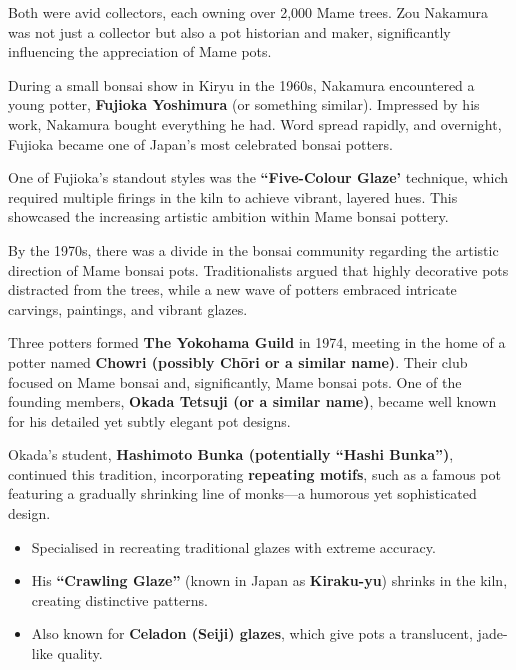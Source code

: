 Both were avid collectors, each owning over 2,000 Mame trees.
Zou Nakamura was not just a collector but also a pot historian and maker, significantly influencing the appreciation of Mame pots.

During a small bonsai show in Kiryu in the 1960s, Nakamura encountered a young potter, \textbf{Fujioka Yoshimura} (or something similar).
Impressed by his work, Nakamura bought everything he had.
Word spread rapidly, and overnight, Fujioka became one of Japan's most celebrated bonsai potters.

\medskip

\noindent
One of Fujioka's standout styles was the \textbf{``Five\--Colour Glaze'} technique, which required multiple firings in the kiln to achieve vibrant, layered hues.
This showcased the increasing artistic ambition within Mame bonsai pottery.

\medskip

\noindent
By the 1970s, there was a divide in the bonsai community regarding the artistic direction of Mame bonsai pots.
Traditionalists argued that highly decorative pots distracted from the trees, while a new wave of potters embraced intricate carvings, paintings, and vibrant glazes.

Three potters formed \textbf{The Yokohama Guild} in 1974, meeting in the home of a potter named \textbf{Chowri (possibly Chōri or a similar name)}.
Their club focused on Mame bonsai and, significantly, Mame bonsai pots.
One of the founding members, \textbf{Okada Tetsuji (or a similar name)}, became well known for his detailed yet subtly elegant pot designs.

Okada's student, \textbf{Hashimoto Bunka (potentially ``Hashi Bunka'')}, continued this tradition, incorporating \textbf{repeating motifs}, such as a famous pot featuring a gradually shrinking line of monks—a humorous yet sophisticated design.

\medskip

{}
\noindent
\begin{itemize}
    \item Specialised in recreating traditional glazes with extreme accuracy.

    \item His \textbf{``Crawling Glaze''} (known in Japan as \textbf{Kiraku\--yu}) shrinks in the kiln, creating distinctive patterns.
    
    \item Also known for \textbf{Celadon (Seiji) glazes}, which give pots a translucent, jade\--like quality.
\end{itemize}

